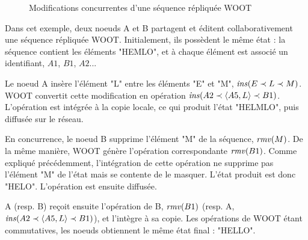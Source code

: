 \begin{figure}[!ht]
{
  }
  \caption{Modifications concurrentes d'une séquence répliquée WOOT}
  \label{fig:woot}
\end{figure}

Dans cet exemple, deux noeuds A et B partagent et éditent collaborativement une séquence répliquée WOOT.
Initialement, ils possèdent le même état : la séquence contient les éléments "HEMLO", et à chaque élément est associé un identifiant, \eg $A1$, $B1$, $A2$...

Le noeud A insère l'élément "L" entre les éléments "E" et "M", \ie $\mathit{ins}(E \prec L \prec M)$.
WOOT convertit cette modification en opération $\mathit{ins}(A2 \prec \langle A5,L \rangle \prec B1)$. L'opération est intégrée à la copie locale, ce qui produit l'état "HELMLO", puis diffusée sur le réseau.

En concurrence, le noeud B supprime l'élément "M" de la séquence, \ie $\mathit{rmv}(M)$.
De la même manière, WOOT génère l'opération correspondante $\mathit{rmv}(B1)$.
Comme expliqué précédemment, l'intégration de cette opération ne supprime pas l'élément "M" de l'état mais se contente de le masquer.
L'état produit est donc "HELO".
L'opération est ensuite diffusée.

A (resp. B) reçoit ensuite l'opération de B, $\mathit{rmv}(B1)$ (resp. A, $\mathit{ins}(A2 \prec \langle A5,L \rangle \prec B1)$), et l'intègre à sa copie.
Les opérations de WOOT étant commutatives, les noeuds obtiennent le même état final : "HELLO".

